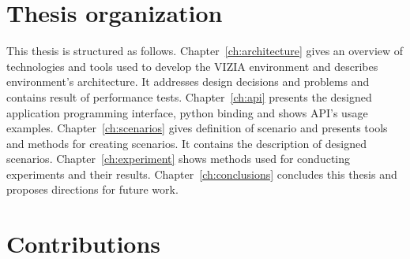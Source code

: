 \documentclass[english,bachelor,a4paper,twoside]{ppfcmthesis}
\begin{document}
	
\section{Thesis organization}


This thesis is structured as follows. 
Chapter~\ref{ch:architecture} gives an overview of technologies and tools used to develop the VIZIA environment and describes environment's architecture. It addresses design decisions and problems and contains result of performance tests. 
Chapter~\ref{ch:api} presents the designed application programming interface, python binding and shows API's usage examples. 
Chapter~\ref{ch:scenarios} gives definition of scenario and presents tools and methods for creating scenarios. It contains the description of designed scenarios. 
Chapter~\ref{ch:experiment} shows methods used for conducting experiments and their results. 
Chapter~\ref{ch:conclusions} concludes this thesis and proposes directions for future work.

\section{Contributions}
\end{document}
